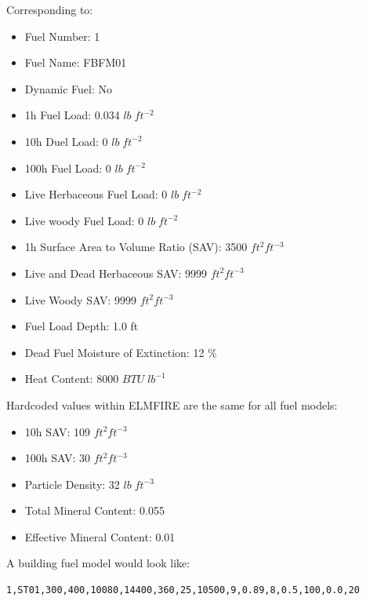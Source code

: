 Corresponding to:
\begin{itemize}
    \item Fuel Number: 1
    \item Fuel Name: FBFM01
    \item Dynamic Fuel: No
    \item 1h Fuel Load: 0.034 $lb\; ft^{-2}$
    \item 10h Duel Load: 0 $lb\; ft^{-2}$
    \item 100h Fuel Load: 0 $lb\; ft^{-2}$
    \item Live Herbaceous Fuel Load: 0 $lb\; ft^{-2}$
    \item Live woody Fuel Load: 0 $lb\; ft^{-2}$
    \item 1h Surface Area to Volume Ratio (SAV): 3500 $ft^2 ft^{-3}$
    \item Live and Dead Herbaceous SAV: 9999 $ft^2 ft^{-3}$
    \item Live Woody SAV: 9999 $ft^2 ft^{-3}$
    \item Fuel Load Depth: 1.0 ft
    \item Dead Fuel Moisture of Extinction: 12 \%
    \item Heat Content: 8000 $BTU\;lb^{-1}$
\end{itemize}

Hardcoded values within ELMFIRE are the same for all fuel models:

\begin{itemize}
    \item 10h SAV: 109 $ft^2 ft^{-3}$
    \item 100h SAV: 30 $ft^2 ft^{-3}$
    \item Particle Density: 32 $lb\;ft^{-3}$
    \item Total Mineral Content: 0.055
    \item Effective Mineral Content: 0.01
\end{itemize}

A building fuel model would look like:

\begin{verbatim}
1,ST01,300,400,10080,14400,360,25,10500,9,0.89,8,0.5,100,0.0,20
\end{verbatim}

